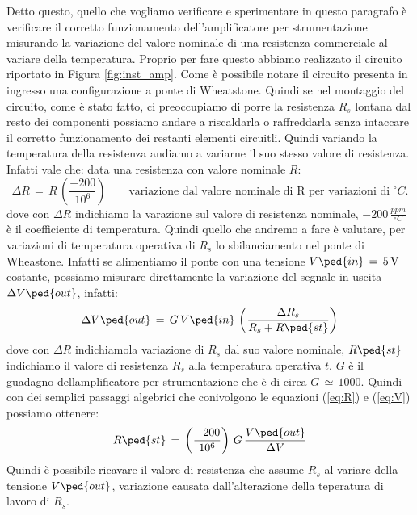 Detto questo, quello che vogliamo verificare e sperimentare in questo paragrafo è verificare il corretto funzionamento dell'amplificatore per strumentazione misurando la variazione del valore nominale di una resistenza commerciale al variare della temperatura. Proprio per fare questo abbiamo realizzato il circuito riportato in Figura \ref{fig:inst_amp}. Come è possibile notare il circuito presenta in ingresso una configurazione a ponte di Wheatstone. Quindi se nel montaggio del circuito, come è stato fatto, ci preoccupiamo di porre la resistenza $R_s$ lontana dal resto dei componenti possiamo andare a riscaldarla o raffreddarla senza intaccare il corretto funzionamento dei restanti elementi circuitli. Quindi variando la temperatura della resistenza andiamo a variarne il suo stesso valore di resistenza. Infatti vale che: data una resistenza con valore nominale $R$:
\begin{equation}
        \Delta R\,=\,R\,\left(\frac{-200}{10^6}\right) \qquad \text{variazione dal valore nominale di R per variazioni di $^\circ C$.}
        \label{eq:R}
\end{equation}
dove con $\Delta R$ indichiamo la varazione sul valore di resistenza nominale, $-200\,\frac{ppm}{^\circ C}$ è il coefficiente di temperatura.
Quindi quello che andremo a fare è valutare, per variazioni di temperatura operativa di $R_s$ lo sbilanciamento nel ponte di Wheastone. Infatti se alimentiamo il ponte con una tensione $V\ped{in}\,=\,\SI{5}{\volt}$ costante, possiamo misurare direttamente la variazione del segnale in uscita $\Delta V\ped{out}$, infatti:
\begin{equation}
        \Delta V\ped{out}\,=\,G\,V\ped{in}\,\left(\frac{\Delta R_s}{R_s + R\ped{st}}\right)
        \label{eq:V}
\end{equation}
dove con $\Delta R$ indichiamola variazione di $R_s$ dal suo valore nominale, $R\ped{st}$ indichiamo il valore di resistenza $R_s$ alla temperatura operativa $t$. $G$ è il guadagno dellamplificatore per strumentazione che è di circa $G\,\simeq\,1000$.
Quindi con dei semplici passaggi algebrici che conivolgono le equazioni (\ref{eq:R}) e (\ref{eq:V}) possiamo ottenere:
\begin{equation}
        R\ped{st}\,=\,\left(\frac{-200}{10^6}\right)\,G\,\frac{V\ped{out}}{\Delta V}
        \label{eq:R_t}
\end{equation}
Quindi è possibile ricavare il valore di resistenza che assume $R_s$ al variare della tensione $V\ped{out}$, variazione causata dall'alterazione della teperatura di lavoro di $R_s$.


